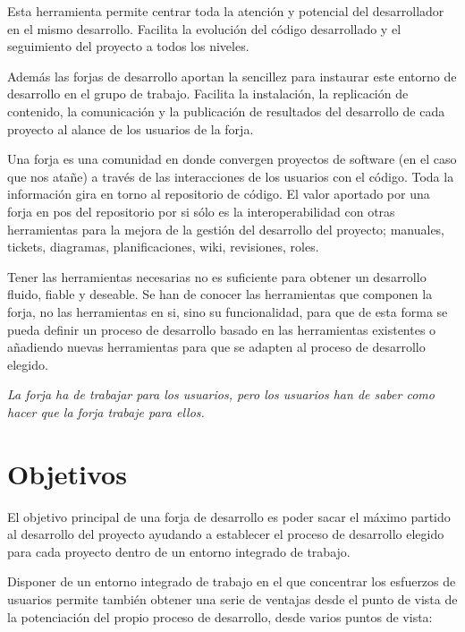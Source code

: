 \par Esta herramienta permite centrar toda la atención y potencial del desarrollador en el mismo desarrollo. Facilita la evolución del código desarrollado y el seguimiento del proyecto a todos los niveles.

\par Además las forjas de desarrollo aportan la sencillez para instaurar este entorno de desarrollo en el grupo de trabajo. Facilita la instalación, la replicación de contenido, la comunicación y la publicación de resultados del desarrollo de cada proyecto al alance de los usuarios de la forja.

\par Una forja es una comunidad en donde convergen proyectos de software (en el caso que nos atañe) a través de las interacciones de los usuarios con el código. Toda la información gira en torno al repositorio de código. El valor aportado por una forja en pos del repositorio por si sólo es la interoperabilidad con otras herramientas para la mejora de la gestión del desarrollo del proyecto; manuales, tickets, diagramas, planificaciones, wiki, revisiones, roles.

\par Tener las herramientas necesarias no es suficiente para obtener un desarrollo fluido, fiable y deseable. Se han de conocer las herramientas que componen la forja, no las herramientas en si, sino su funcionalidad, para que de esta forma se pueda definir un proceso de desarrollo basado en las herramientas existentes o añadiendo nuevas herramientas para que se adapten al proceso de desarrollo elegido. 

\par \emph{La forja ha de trabajar para los usuarios, pero los usuarios han de saber como hacer que la forja trabaje para ellos.}


\section{Objetivos}
\label{sec:objetivos}

\par El objetivo principal de una forja de desarrollo es poder sacar el máximo partido al desarrollo del proyecto ayudando a establecer el proceso de desarrollo elegido para cada proyecto dentro de un entorno integrado de trabajo.

\par Disponer de un entorno integrado de trabajo en el que concentrar los esfuerzos de usuarios permite también obtener una serie de ventajas desde el punto de vista de la potenciación del propio proceso de desarrollo, desde varios puntos de vista:

